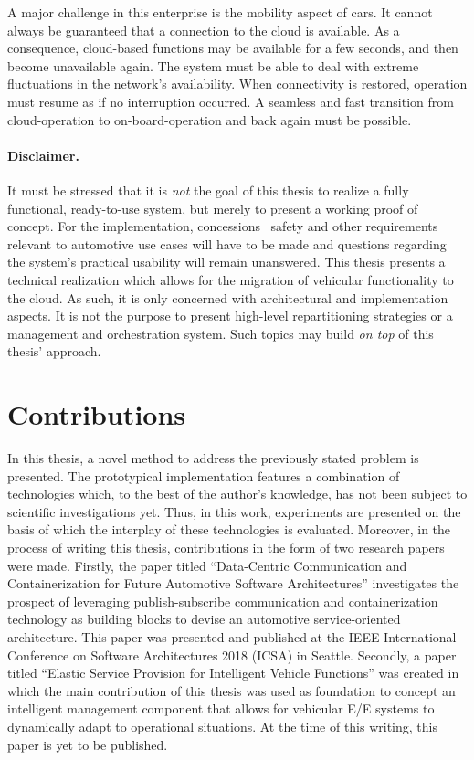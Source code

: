 A major challenge in this enterprise is the mobility aspect of cars. It cannot always be guaranteed that a connection to the cloud is available. As a consequence, cloud-based functions may be available for a few seconds, and then become unavailable again. The system must be able to deal with extreme fluctuations in the network's availability. When connectivity is restored, operation must resume as if no interruption occurred. A seamless and fast transition from cloud-operation to on-board-operation and back again must be possible.

\paragraph{Disclaimer.}
It must be stressed that it is \emph{not} the goal of this thesis to realize a fully functional, ready-to-use system, but merely to present a working proof of concept. For the implementation, concessions \wrt\ safety and other requirements relevant to automotive use cases will have to be made and questions regarding the system's practical usability will remain unanswered. This thesis presents a technical realization which allows for the migration of vehicular functionality to the cloud. As such, it is only concerned with architectural and implementation aspects.
It is not the purpose to present high-level repartitioning strategies or a management and orchestration system. Such topics may build \emph{on top} of this thesis' approach.
%
%
%
%
%
%
%
%
%
%
\section{Contributions}
In this thesis, a novel method to address the previously stated problem is presented. The prototypical implementation features a combination of technologies which, to the best of the author's knowledge, has not been subject to scientific investigations yet. Thus, in this work, experiments are presented on the basis of which the interplay of these technologies is evaluated.
Moreover, in the process of writing this thesis, contributions in the form of two research papers were made.
Firstly, the paper titled ``Data-Centric Communication and Containerization for Future Automotive Software Architectures'' \cite{kugele:hettler:peter:icsa18} investigates the prospect of leveraging publish-subscribe communication and containerization technology as building blocks to devise an automotive service-oriented architecture. This paper was presented and published at the IEEE International Conference on Software Architectures 2018 (ICSA) in Seattle.
Secondly, a paper titled ``Elastic Service Provision for Intelligent Vehicle Functions'' \cite{kugele:hettler:itsc} was created in which the main contribution of this thesis was used as foundation to concept an intelligent management component that allows for vehicular E/E systems to dynamically adapt to operational situations. At the time of this writing, this paper is yet to be published.
%
%
%
%
%
%
%
%
%
%
